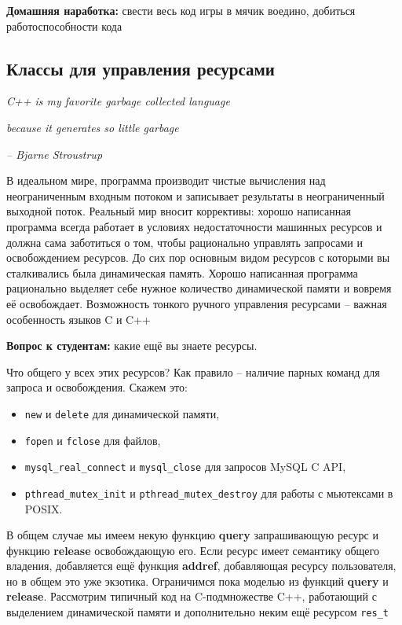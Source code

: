 \documentclass[a4paper,12pt,oneside]{article}
\newif\ifanswers
\begin{document}
\textbf{Домашняя наработка:} свести весь код игры в мячик воедино, добиться работоспособности кода

\pagebreak
\subsection{Классы для управления ресурсами}\label{WrapClasses}

\hfill\textit{C++ is my favorite garbage collected language}

\hfill\textit{because it generates so little garbage}{\vspace{0.5em}}

\hfill\textit{-- Bjarne Stroustrup}

В идеальном мире, программа производит чистые вычисления над неограниченным входным потоком и записывает результаты в неограниченный выходной поток. Реальный мир вносит коррективы: хорошо написанная программа всегда работает в условиях недостаточности машинных ресурсов и должна сама заботиться о том, чтобы рационально управлять запросами и освобождением ресурсов. До сих пор основным видом ресурсов с которыми вы сталкивались была динамическая память. Хорошо написанная программа рационально выделяет себе нужное количество динамической памяти и вовремя её освобождает. Возможность тонкого ручного управления ресурсами -- важная особенность языков C и C++

\textbf{Вопрос к студентам:} какие ещё вы знаете ресурсы.

\ifanswers
Ожидаемые ответы: файловые дескрипторы, мьютексы, шрифты и кисти, объекты гуя, соединения с бд, сокеты.
\fi

Что общего у всех этих ресурсов? Как правило -- наличие парных команд для запроса и освобождения. 
Скажем это: 
\begin{itemize}
\item
\lstinline!new! и \lstinline!delete! для динамической памяти, 
\item
\lstinline!fopen! и \lstinline!fclose! для файлов, 
\item
\lstinline!mysql_real_connect! и \lstinline!mysql_close! для запросов MySQL C API, 
\item
\lstinline!pthread_mutex_init! и \lstinline!pthread_mutex_destroy! для работы с мьютексами в POSIX. 
\end{itemize}

В общем случае мы имеем некую функцию \textbf{query} запрашивающую ресурс и функцию \textbf{release} освобождающую его. Если ресурс имеет семантику общего владения, добавляется ещё функция \textbf{addref}, добавляющая ресурсу пользователя, но в общем это уже экзотика. Ограничимся пока моделью из функций \textbf{query} и \textbf{release}. Рассмотрим типичный код на C-подмножестве C++, работающий с выделением динамической памяти и дополнительно неким ещё ресурсом \lstinline!res_t!
\end{document}
